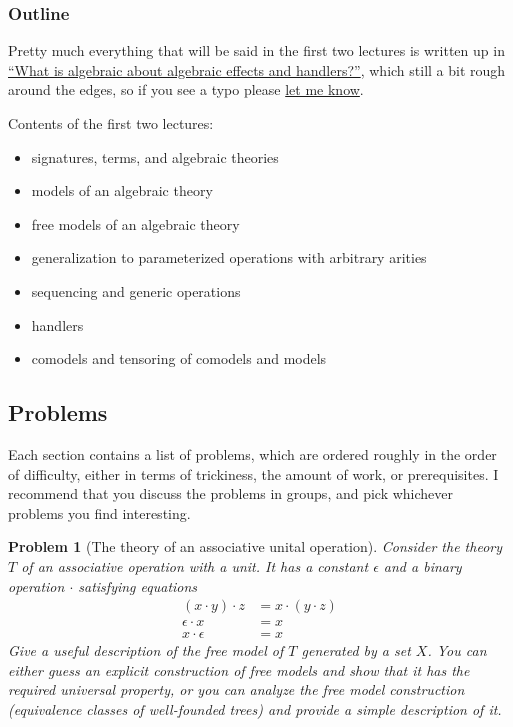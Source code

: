 \documentclass{article}
\newtheorem{problem}{Problem}[section]}
\begin{document}
\hypertarget{outline}{%
\subsubsection*{Outline}\label{outline}}

Pretty much everything that will be said in the first two lectures is written
up in \href{https://arxiv.org/abs/1807.05923}{``What is algebraic about
algebraic effects and handlers?''}, which still a bit rough around the
edges, so if you see a typo please
\href{https://github.com/andrejbauer/what-is-algebraic-about-algebraic-effects}{let
me know}.

Contents of the first two lectures:
%
\begin{itemize}
\item
  signatures, terms, and algebraic theories
\item
  models of an algebraic theory
\item
  free models of an algebraic theory
\item
  generalization to parameterized operations with arbitrary arities
\item
  sequencing and generic operations
\item
  handlers
\item
  comodels and tensoring of comodels and models
\end{itemize}

\hypertarget{problems}{%
\subsection{Problems}\label{problems}}

Each section contains a list of problems, which are ordered roughly in the order
of difficulty, either in terms of trickiness, the amount of work, or
prerequisites. I recommend that you discuss the problems in groups, and pick
whichever problems you find interesting.

\begin{problem}[The theory of an associative unital operation]
Consider the theory $T$ of an associative operation with a unit.
It has a constant $\epsilon$ and a binary operation $\cdot$
satisfying equations
%
\begin{align*}
(x \cdot y) \cdot z &= x \cdot (y \cdot z) \\
\epsilon \cdot x &= x \\
x \cdot \epsilon &= x
\end{align*}
%
Give a useful description of the free model of $T$ generated by a
set $X$. You can either guess an explicit construction of free
models and show that it has the required universal property, or you can
analyze the free model construction (equivalence classes of well-founded
trees) and provide a simple description of it.
\end{problem}
\end{document}
